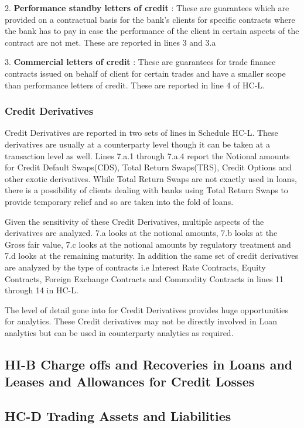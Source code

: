 \documentclass[conference]{IEEEtran}
\begin{document}
       2. \textbf{Performance standby letters of credit} : These are guarantees which are provided on a contractual basis for the bank's clients for specific contracts where the bank has to pay in case the performance of the client in certain aspects of the contract are not met. These are reported in lines 3 and 3.a
       
       3. \textbf{Commercial letters of credit} : These are guarantees for trade finance contracts issued on behalf of client for certain trades and have a smaller scope than performance letters of credit. These are reported in line 4 of HC-L.
       
       \subsubsection{Credit Derivatives}
       Credit Derivatives are reported in two sets of lines in Schedule HC-L. These derivatives are usually at a counterparty level though it can be taken at a transaction level as well. Lines 7.a.1 through 7.a.4 report the Notional amounts for Credit Default Swaps(CDS), Total Return Swaps(TRS), Credit Options and other exotic derivatives. While Total Return Swaps are not exactly used in loans, there is a possibility of clients dealing with banks using Total Return Swaps to provide temporary relief and so are taken into the fold of loans. 
       
       Given the sensitivity of these Credit Derivatives, multiple aspects of the derivatives are analyzed. 7.a looks at the notional amounts, 7.b looks at the Gross fair value, 7.c looks at the notional amounts by regulatory treatment and 7.d looks at the remaining maturity. In addition the same set of credit derivatives are analyzed by the type of contracts i.e Interest Rate Contracts, Equity Contracts, Foreign Exchange Contracts and Commodity Contracts in lines 11 through 14 in HC-L.
       
       The level of detail gone into for Credit Derivatives provides huge opportunities for analytics. These Credit derivatives may not be directly involved in Loan analytics but can be used in counterparty analytics as required.
    
    \subsection{HI-B Charge offs and Recoveries in Loans and Leases and Allowances for Credit Losses}
    \subsection{HC-D Trading Assets and Liabilities}
\end{document}
